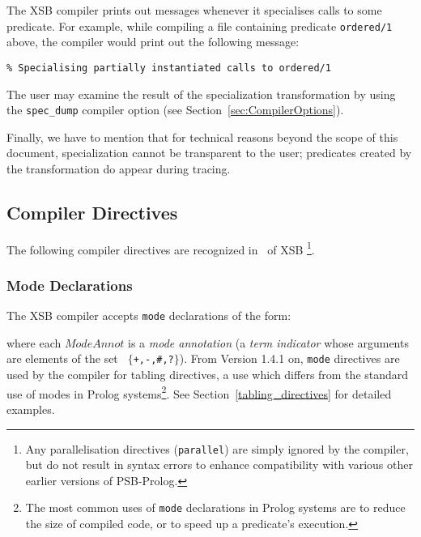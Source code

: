 The XSB compiler prints out messages whenever it specialises
calls to some predicate.  For example, while compiling a file
containing predicate {\tt ordered/1} above, the compiler would print
out the following message:
\begin{center}
{\tt	\% Specialising partially instantiated calls to ordered/1}
\end{center}
The user may examine the result of the specialization transformation
by using the {\tt spec\_dump} compiler option
(see Section~\ref{sec:CompilerOptions}).

Finally, we have to mention that for technical reasons beyond the scope of
this document, specialization cannot be transparent to the user; predicates
created by the transformation do appear during tracing.


\subsection{Compiler Directives}\label{compiler_directives}

The following compiler directives are recognized in \version\ of XSB
\footnote{Any parallelisation directives ({\tt parallel}) are simply
ignored by the compiler, but do not result in syntax errors to enhance
compatibility with various other earlier versions of PSB-Prolog.}.

\subsubsection{Mode Declarations}\label{mode_declarations}

The XSB compiler accepts {\tt mode} declarations of the form:


\noindent
where each $ModeAnnot$ is a {\em mode annotation\/} (a {\em term
indicator\/} whose arguments are elements of the set {\tt
$\{$+,-,\#,?$\}$}).  From Version 1.4.1 on, {\tt mode} directives are
used by the compiler for tabling directives, a use which differs from
the standard use of modes in Prolog systems\footnote{The most common
uses of {\tt mode} declarations in Prolog systems are to reduce the
size of compiled code, or to speed up a predicate's execution.}.  See
Section~\ref{tabling_directives} for detailed examples.

